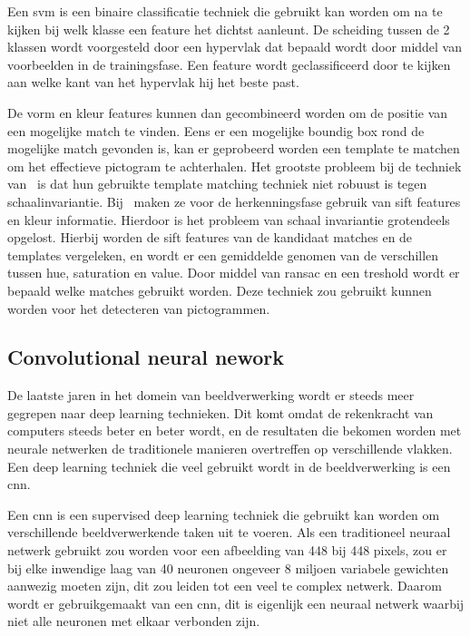             Een \gls{svm} is een binaire classificatie techniek die gebruikt kan worden om na te kijken bij welk klasse een feature het dichtst aanleunt.
            De scheiding tussen de 2 klassen wordt voorgesteld door een hypervlak dat bepaald wordt door middel van voorbeelden in de trainingsfase.
            Een feature wordt geclassificeerd door te kijken aan welke kant van het hypervlak hij het beste past.

            De vorm en kleur features kunnen dan gecombineerd worden om de positie van een mogelijke match te vinden. Eens er een mogelijke boundig box rond de mogelijke match gevonden is,
            kan er geprobeerd worden een template te matchen om het effectieve pictogram te achterhalen. Het grootste probleem bij de techniek van~\cite{Fang2003} is
            dat hun gebruikte template matching techniek niet robuust is tegen schaalinvariantie.
            Bij~\cite{Zabihi2017} maken ze voor de herkenningsfase gebruik van \gls{sift}\cite{Lowe1999} features en kleur informatie.
            Hierdoor is het probleem van schaal invariantie grotendeels opgelost.
            Hierbij worden de \gls{sift} features van de kandidaat matches en de templates vergeleken, en wordt er een gemiddelde genomen van de verschillen tussen hue, saturation en value.
            Door middel van \gls{ransac} en een treshold wordt er bepaald welke matches gebruikt worden. Deze techniek zou gebruikt kunnen worden voor het detecteren van pictogrammen.

        
        \subsection{Convolutional neural nework} \label{sec:yolo}
            De laatste jaren in het domein van beeldverwerking wordt er steeds meer gegrepen naar deep learning technieken.
            Dit komt omdat de rekenkracht van computers steeds beter en beter wordt, en de resultaten die bekomen worden met neurale netwerken de traditionele manieren overtreffen op verschillende vlakken.
            Een deep learning techniek die veel gebruikt wordt in de beeldverwerking is een \gls{cnn}.

            Een \gls{cnn} is een supervised deep learning techniek die gebruikt kan worden om verschillende beeldverwerkende taken uit te voeren.
            Als een traditioneel neuraal netwerk gebruikt zou worden voor een afbeelding van 448 bij 448 pixels, zou er bij elke inwendige laag van 40 neuronen ongeveer 8 miljoen variabele gewichten aanwezig moeten zijn,
            dit zou leiden tot een veel te complex netwerk.
            Daarom wordt er gebruikgemaakt van een \gls{cnn}, dit is eigenlijk een neuraal netwerk waarbij niet alle neuronen met elkaar verbonden zijn.

